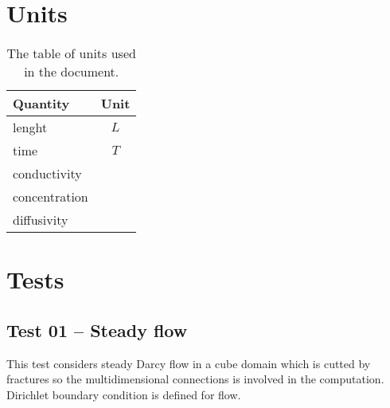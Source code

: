 %
%
%
%

\chapter{Units}
\begin{table}
  \label{tab:units}
  \begin{center}
    \begin{tabular}{|l|c|}
      \hline
      \textbf{Quantity} & \textbf{Unit} \\
      \hline 
      lenght & $L$ \\
      time & $T$ \\
      conductivity & $ $ \\
      concentration & $ $ \\
      diffusivity & $ $ \\
      \hline
    \end{tabular}
  \caption{The table of units used in the document.}
  \end{center}
\end{table}

\chapter{Tests}
\label{sec:tests}

\section{Test 01 -- Steady flow}
\label{sec:test01}
This test considers steady Darcy flow in a cube domain which is cutted by fractures so the multidimensional connections is involved in the computation. Dirichlet boundary condition is defined for flow.

